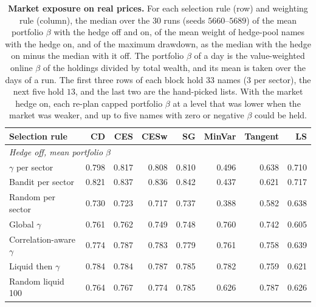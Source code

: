 \begin{table}[H]
\centering
\small
\setlength{\tabcolsep}{4pt}
\caption{\textbf{Market exposure on real prices.} For each selection rule (row) and weighting rule (column), the
median over the $30$ runs (seeds $5660$--$5689$) of the mean portfolio $\beta$ with the hedge off and on, of the
mean weight of hedge-pool names with the hedge on, and of the maximum drawdown, as the median with the hedge on
minus the median with it off. The portfolio $\beta$ of a day is the value-weighted online $\beta$ of the holdings
divided by total wealth, and its mean is taken over the days of a run. The first three rows of each block hold $33$
names ($3$ per sector), the next five hold $13$, and the last two are the hand-picked lists. With the market hedge
on, each re-plan capped portfolio $\beta$ at a level that was lower when the market was weaker, and up to five names with zero or negative $\beta$
could be held.}
\label{tab:S-exposure}
\begin{tabular}{l*{7}{r}}
\toprule
Selection rule & CD & CES & CESw & SG & MinVar & Tangent & LS \\
\midrule
\multicolumn{8}{l}{\emph{Hedge off, mean portfolio $\beta$}} \\
$\gamma$ per sector & 0.798 & 0.817 & 0.808 & 0.810 & 0.496 & 0.638 & 0.710 \\
Bandit per sector & 0.821 & 0.837 & 0.836 & 0.842 & 0.437 & 0.621 & 0.717 \\
Random per sector & 0.730 & 0.723 & 0.717 & 0.737 & 0.388 & 0.582 & 0.638 \\
\addlinespace[2pt]
Global $\gamma$ & 0.761 & 0.762 & 0.749 & 0.748 & 0.760 & 0.742 & 0.605 \\
Correlation-aware $\gamma$ & 0.774 & 0.787 & 0.783 & 0.779 & 0.761 & 0.758 & 0.639 \\
Liquid then $\gamma$ & 0.784 & 0.784 & 0.787 & 0.785 & 0.782 & 0.759 & 0.621 \\
Random liquid 100 & 0.764 & 0.767 & 0.774 & 0.785 & 0.626 & 0.787 & 0.626 \\

\end{tabular}
\end{table}
